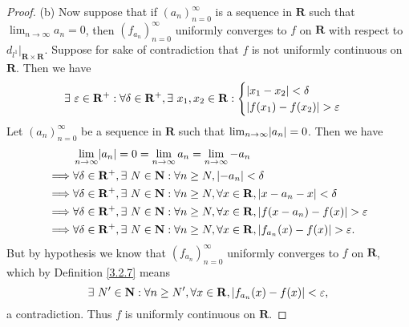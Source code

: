\begin{proof}{(b)}
    Now suppose that if \((a_n)_{n = 0}^\infty\) is a sequence in \(\mathbf{R}\) such that \(\lim_{n \to \infty} a_n = 0\), then \((f_{a_n})_{n = 0}^\infty\) uniformly converges to \(f\) on \(\mathbf{R}\) with respect to \(d_{l^1}|_{\mathbf{R} \times \mathbf{R}}\).
    Suppose for sake of contradiction that \(f\) is not uniformly continuous on \(\mathbf{R}\).
    Then we have
    \[
        \exists\ \varepsilon \in \mathbf{R}^+ : \forall \delta \in \mathbf{R}^+, \exists\ x_1, x_2 \in \mathbf{R} : \begin{cases}
            \abs*{x_1 - x_2} < \delta \\
            \abs*{f(x_1) - f(x_2)} > \varepsilon
        \end{cases}
    \]
    Let \((a_n)_{n = 0}^\infty\) be a sequence in \(\mathbf{R}\) such that \(\lim_{n \to \infty} \abs*{a_n} = 0\).
    Then we have
    \begin{align*}
                 & \lim_{n \to \infty} \abs*{a_n} = 0 = \lim_{n \to \infty} a_n = \lim_{n \to \infty} -a_n                                                          \\
        \implies & \forall \delta \in \mathbf{R}^+, \exists\ N \in \mathbf{N} : \forall n \geq N, \abs*{-a_n} < \delta                                              \\
        \implies & \forall \delta \in \mathbf{R}^+, \exists\ N \in \mathbf{N} : \forall n \geq N, \forall x \in \mathbf{R}, \abs*{x - a_n - x} < \delta             \\
        \implies & \forall \delta \in \mathbf{R}^+, \exists\ N \in \mathbf{N} : \forall n \geq N, \forall x \in \mathbf{R}, \abs*{f(x - a_n) - f(x)} > \varepsilon  \\
        \implies & \forall \delta \in \mathbf{R}^+, \exists\ N \in \mathbf{N} : \forall n \geq N, \forall x \in \mathbf{R}, \abs*{f_{a_n}(x) - f(x)} > \varepsilon.
    \end{align*}
    But by hypothesis we know that \((f_{a_n})_{n = 0}^\infty\) uniformly converges to \(f\) on \(\mathbf{R}\), which by Definition \ref{3.2.7} means
    \[
        \exists\ N' \in \mathbf{N} : \forall n \geq N', \forall x \in \mathbf{R}, \abs*{f_{a_n}(x) - f(x)} < \varepsilon,
    \]
    a contradiction.
    Thus \(f\) is uniformly continuous on \(\mathbf{R}\).
\end{proof}

